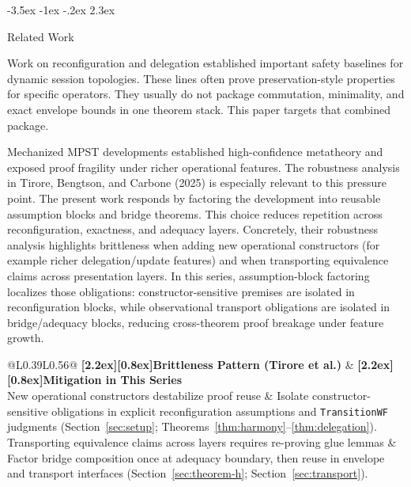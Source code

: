 \documentclass[a4paper,10pt,twocolumn,english]{article}
\makeatletter
\renewcommand{\section}{\@startsection{section}{1}{\z@}%
  {-3.5ex \@plus -1ex \@minus -.2ex}%
  {2.3ex}%
  {\raggedright\normalfont\large\bfseries}}
\numberwithin{equation}{section}
\theoremstyle{paperdef}
\theoremstyle{paperplain}
\theoremstyle{paperdef}
\theoremstyle{paperremark}
\theoremstyle{paperdef}
\newcommand{\thead}[1]{\textbf{\raisebox{0pt}[2.2ex][0.8ex]{#1}}}
\makeatother
\begin{document}
\section{Related Work}
\label{sec:related}

Work on reconfiguration and delegation established important safety baselines for dynamic session topologies. These lines often prove preservation-style properties for specific operators. They usually do not package commutation, minimality, and exact envelope bounds in one theorem stack. This paper targets that combined package.

Mechanized MPST developments established high-confidence metatheory and exposed proof fragility under richer operational features. The robustness analysis in Tirore, Bengtson, and Carbone (2025) is especially relevant to this pressure point. The present work responds by factoring the development into reusable assumption blocks and bridge theorems. This choice reduces repetition across reconfiguration, exactness, and adequacy layers.
Concretely, their robustness analysis highlights brittleness when adding new
operational constructors (for example richer delegation/update features) and
when transporting equivalence claims across presentation layers. In this series,
assumption-block factoring localizes those obligations: constructor-sensitive
premises are isolated in reconfiguration blocks, while observational transport
obligations are isolated in bridge/adequacy blocks, reducing cross-theorem
proof breakage under feature growth.
\begin{table}[H]
	\centering
	\footnotesize
	\begin{tabularx}{\columnwidth}{@{}L{0.39\columnwidth}L{0.56\columnwidth}@{}}
		\toprule
		\thead{Brittleness Pattern (Tirore et al.)}                                   & \thead{Mitigation in This Series}                                                                                                                                                                  \\
		\midrule
		New operational constructors destabilize proof reuse                          & Isolate constructor-sensitive obligations in explicit reconfiguration assumptions and \texttt{TransitionWF} judgments (Section~\ref{sec:setup}; Theorems~\ref{thm:harmony}--\ref{thm:delegation}). \\
		Transporting equivalence claims across layers requires re-proving glue lemmas & Factor bridge composition once at adequacy boundary, then reuse in envelope and transport interfaces (Section~\ref{sec:theorem-h}; Section~\ref{sec:transport}).                                   \\
		\bottomrule
	\end{tabularx}
	\caption{Concrete mapping from reported robustness pressure points to mitigations in this series.}
	\label{tab:p3-tirore-mitigation}
\end{table}
\end{document}
